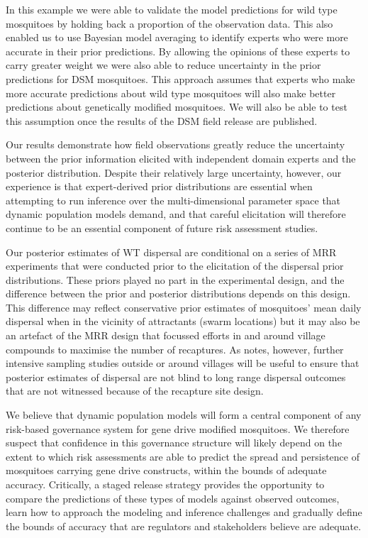 \documentclass[]{bmcart}
\begin{document}
In this example we were able to validate the model predictions for wild type mosquitoes by holding back a proportion of the observation data. This also enabled us to use Bayesian model averaging to identify experts who were more accurate in their prior predictions. By allowing the opinions of these experts to carry greater weight we were also able to reduce uncertainty in the prior predictions for DSM mosquitoes. This approach assumes that experts who make more accurate predictions about wild type mosquitoes will also make better predictions about genetically modified mosquitoes. We will also be able to test this assumption once the results of the DSM field release are published.

Our results demonstrate how field observations greatly reduce the uncertainty between the prior information elicited with independent domain experts and the posterior distribution. Despite their relatively large uncertainty, however, our experience is that expert-derived prior distributions are essential when attempting to run inference over the multi-dimensional parameter space that dynamic population models demand, and that careful elicitation will therefore continue to be an essential component of future risk assessment studies.

Our posterior estimates of WT dispersal are conditional on a series of MRR experiments that were conducted prior to the elicitation of the dispersal prior distributions. These priors played no part in the experimental design, and the difference between the prior and posterior distributions depends on this design. This difference may reflect conservative prior estimates of mosquitoes' mean daily dispersal when in the vicinity of attractants (swarm locations) but it may also be an artefact of the MRR design that focussed efforts in and around village compounds to maximise the number of recaptures. As \cite{Epopa2017} notes, however, further intensive sampling studies outside or around villages will be useful to ensure that posterior estimates of dispersal are not blind to long range dispersal outcomes that are not witnessed because of the recapture site design.

We believe that dynamic population models will form a central component of any risk-based governance system for gene drive modified mosquitoes. We therefore suspect that confidence in this governance structure will likely depend on the extent to which risk assessments are able to predict the spread and persistence of mosquitoes carrying gene drive constructs, within the bounds of adequate accuracy. Critically, a staged release strategy provides the opportunity to compare the predictions of these types of models against observed outcomes, learn how to approach the modeling and inference challenges and gradually define the bounds of accuracy that are regulators and stakeholders believe are adequate.
\end{document}
